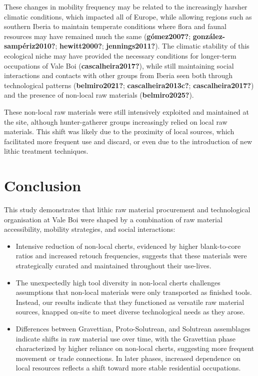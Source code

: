 \documentclass[
  a4paper,
  DIV=11,
  numbers=noendperiod]{scrreprt}
\begin{document}
These changes in mobility frequency may be related to the increasingly
harsher climatic conditions, which impacted all of Europe, while
allowing regions such as southern Iberia to maintain temperate
conditions where flora and faunal resources may have remained much the
same (\textbf{gómez2007?}; \textbf{gonzález-sampériz2010?};
\textbf{hewitt2000?}; \textbf{jennings2011?}). The climatic stability of
this ecological niche may have provided the necessary conditions for
longer-term occupations of Vale Boi (\textbf{cascalheira2017?}), while
still maintaining social interactions and contacts with other groups
from Iberia seen both through technological patterns
(\textbf{belmiro2021?}; \textbf{cascalheira2013c?};
\textbf{cascalheira2017?}) and the presence of non-local raw materials
(\textbf{belmiro2025?}).

These non-local raw materials were still intensively exploited and
maintained at the site, although hunter-gatherer groups increasingly
relied on local raw materials. This shift was likely due to the
proximity of local sources, which facilitated more frequent use and
discard, or even due to the introduction of new lithic treatment
techniques.

\section{Conclusion}\label{conclusion-1}

This study demonstrates that lithic raw material procurement and
technological organisation at Vale Boi were shaped by a combination of
raw material accessibility, mobility strategies, and social
interactions:

\begin{itemize}
\item
  Intensive reduction of non-local cherts, evidenced by higher
  blank-to-core ratios and increased retouch frequencies, suggests that
  these materials were strategically curated and maintained throughout
  their use-lives.
\item
  The unexpectedly high tool diversity in non-local cherts challenges
  assumptions that non-local materials were only transported as finished
  tools. Instead, our results indicate that they functioned as versatile
  raw material sources, knapped on-site to meet diverse technological
  needs as they arose.
\item
  Differences between Gravettian, Proto-Solutrean, and Solutrean
  assemblages indicate shifts in raw material use over time, with the
  Gravettian phase characterized by higher reliance on non-local cherts,
  suggesting more frequent movement or trade connections. In later
  phases, increased dependence on local resources reflects a shift
  toward more stable residential occupations.
\end{itemize}
\end{document}
